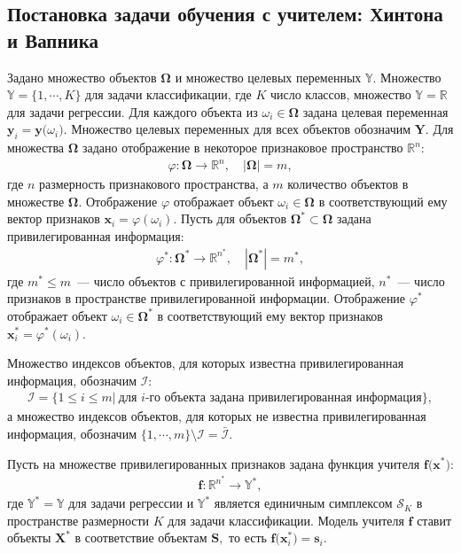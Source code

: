 \subsection{Постановка задачи обучения с учителем: Хинтона и Вапника}
Задано множество объектов $\bm{\Omega}$ и множество целевых переменных $\mathbb{Y}$. Множество $\mathbb{Y}=\{1,\cdots,K\}$ для задачи классификации, где $K$ число классов, множество $\mathbb{Y}=\mathbb{R}$ для задачи регрессии.
Для каждого объекта из $\omega_i \in \bm{\Omega}$ задана целевая переменная $\mathbf{y}_i = \mathbf{y}\bigr(\omega_i\bigr)$. Множество целевых переменных для всех объектов обозначим $\mathbf{Y}$.
Для множества $\bm{\Omega}$ задано отображение в некоторое признаковое пространство $\mathbb{R}^{n}$:
\[
\label{eq:st:phi}
\begin{aligned}
\varphi:\bm{\Omega} \to \mathbb{R}^{n}, \quad \left|\bm{\Omega}\right| = m,
\end{aligned}
\]
где $n$ размерность признакового пространства, а $m$ количество объектов в множестве $\bm{\Omega}$. Отображение $\varphi$ отображает объект $\omega_i \in \bm{\Omega}$ в соответствующий ему вектор признаков $\mathbf{x}_i = \varphi(\omega_i)$.
Пусть для объектов $\bm{\Omega}^* \subset \bm{\Omega}$ задана привилегированная информация:
\[
\label{eq:st:phi*}
\begin{aligned}
\varphi^*:\bm{\Omega}^* \to \mathbb{R}^{n^*}, \quad \left|\bm{\Omega}^*\right| = m^*,
\end{aligned}
\]
где $m^* \leq m$~--- число объектов с привилегированной информацией, $n^*$~--- число признаков в пространстве привилегированной информации. Отображение $\varphi^*$ отображает объект $\omega_i \in \bm{\Omega^*}$ в соответствующий ему вектор признаков $\mathbf{x}^*_i = \varphi^*(\omega_i)$.

Множество индексов объектов, для которых известна привилегированная информация, обозначим $\mathcal{I}$:
\[
\label{eq:st:3}
\begin{aligned}
\mathcal{I} = \{1 \leq i \leq m |~\text{для $i$-го объекта задана привилегированная информация}\},
\end{aligned}
\]
а множество индексов объектов, для которых не известна привилегированная информация, обозначим $\{1, \cdots, m\}\setminus \mathcal{I} = \bar{\mathcal{I}}$.

Пусть на множестве привилегированных признаков задана функция учителя $\mathbf{f}\bigr(\mathbf{x}^*\bigr)$:
\[
\label{eq:st:4}
\begin{aligned}
\mathbf{f}:\mathbb{R}^{n^*} \to \mathbb{Y}^*,
\end{aligned}
\]
где $\mathbb{Y}^*=\mathbb{Y}$ для задачи регрессии и $\mathbb{Y}^*$ является единичным симплексом $\mathcal{S}_K$ в пространстве размерности $K$ для задачи классификации. Модель учителя $\mathbf{f}$ ставит объекты $\mathbf{X}^*$ в соответствие объектам $\mathbf{S},$ то есть  $\mathbf{f}\bigr(\mathbf{x}^*_i\bigr)=\mathbf{s}_i$.

